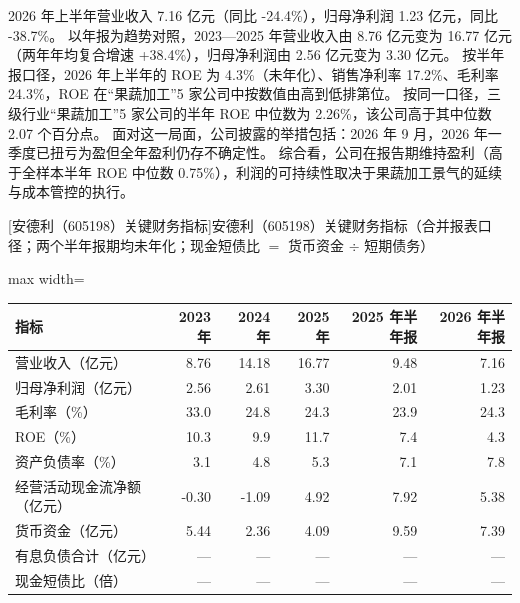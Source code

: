  2026 年上半年营业收入 7.16 亿元（同比 -24.4\%），归母净利润 1.23 亿元，同比 -38.7\%。 以年报为趋势对照，2023---2025 年营业收入由 8.76 亿元变为 16.77 亿元（两年年均复合增速 +38.4\%），归母净利润由 2.56 亿元变为 3.30 亿元。 按半年报口径，2026 年上半年的 ROE 为 4.3\%（未年化）、销售净利率 17.2\%、毛利率 24.3\%，ROE 在“果蔬加工”5 家公司中按数值由高到低排第位。 按同一口径，三级行业“果蔬加工”5 家公司的半年 ROE 中位数为 2.26\%，该公司高于其中位数 2.07 个百分点。 面对这一局面，公司披露的举措包括：2026 年 9 月，2026 年一季度已扭亏为盈但全年盈利仍存不确定性。 综合看，公司在报告期维持盈利（高于全样本半年 ROE 中位数 0.75\%），利润的可持续性取决于果蔬加工景气的延续与成本管控的执行。

\begin{center}\small\setlength{\tabcolsep}{3.4pt}
[安德利（605198）关键财务指标]{安德利（605198）关键财务指标（合并报表口径；两个半年报期均未年化；现金短债比 $=$ 货币资金 $\div$ 短期债务）}
\begin{adjustbox}{max width=\textwidth}
\begin{tabular}{@{}lrrrrr@{}}
\toprule
指标 & 2023 年 & 2024 年 & 2025 年 & 2025 年半年报 & 2026 年半年报 \\
\midrule
营业收入（亿元） & 8.76 & 14.18 & 16.77 & 9.48 & 7.16 \\
归母净利润（亿元） & 2.56 & 2.61 & 3.30 & 2.01 & 1.23 \\
毛利率（\%） & 33.0 & 24.8 & 24.3 & 23.9 & 24.3 \\
ROE（\%） & 10.3 & 9.9 & 11.7 & 7.4 & 4.3 \\
资产负债率（\%） & 3.1 & 4.8 & 5.3 & 7.1 & 7.8 \\
经营活动现金流净额（亿元） & -0.30 & -1.09 & 4.92 & 7.92 & 5.38 \\
货币资金（亿元） & 5.44 & 2.36 & 4.09 & 9.59 & 7.39 \\
有息负债合计（亿元） & --- & --- & --- & --- & --- \\
现金短债比（倍） & --- & --- & --- & --- & --- \\
\bottomrule
\end{tabular}
\end{adjustbox}
\end{center}

